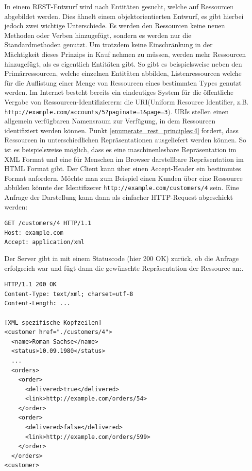 In einem REST-Entwurf wird nach Entitäten gesucht, welche auf Ressourcen abgebildet werden. Dies ähnelt einem objektorientierten Entwurf, es gibt hierbei jedoch zwei wichtige Unterschiede. Es werden den Ressourcen keine neuen Methoden oder Verben hinzugefügt, sondern es werden nur die Standardmethoden genutzt. Um trotzdem keine Einschränkung in der Mächtigkeit dieses Prinzips in Kauf nehmen zu müssen, werden mehr Ressourcen hinzugefügt, als es eigentlich Entitäten gibt. So gibt es beispielsweise neben den Primärressourcen, welche einzelnen Entitäten abbilden, Listenressourcen welche für die Auflistung einer Menge von Ressourcen eines bestimmten Types genutzt werden\cite{tilkovrestchapter4}. Im Internet besteht bereits ein eindeutiges System für die öffentliche Vergabe von Ressourcen-Identifizierern: die URI(Uniform Resource Identifier, z.B. \\ \texttt{http://example.com/accounts/5?paginate=1\&page=3}). URIs stellen einen allgemein verfügbaren Namensraum zur Verfügung, in dem Ressourcen identifiziert werden können. Punkt \ref{enumerate_rest_principles:4} fordert, dass Ressourcen in unterschiedlichen Repräsentationen ausgeliefert werden können. So ist es beispielsweise möglich, dass es eine maschinenlesbare Repräsentation im XML Format und eine für Menschen im Browser darstellbare Repräsentation im HTML Format gibt. Der Client kann über einen Accept-Header ein bestimmtes Format anfordern.
Möchte man zum Beispiel einen Kunden über eine Ressource abbilden könnte der Identifizerer \texttt{http://example.com/customers/4} sein. Eine Anfrage der Darstellung kann dann als einfacher HTTP-Request abgeschickt werden:
\begin{lstlisting}
GET /customers/4 HTTP/1.1
Host: example.com
Accept: application/xml 
\end{lstlisting}

Der Server gibt in mit einem Statuscode (hier 200 OK) zurück, ob die Anfrage erfolgreich war und fügt dann die gewünschte Repräsentation der Ressource an:.

\begin{lstlisting}
HTTP/1.1 200 OK
Content-Type: text/xml; charset=utf-8
Content-Length: ...

[XML spezifische Kopfzeilen]
<customer href="./customers/4">
  <name>Roman Sachse</name>
  <status>10.09.1980</status>
  ...
  <orders>
    <order>
      <delivered>true</delivered>
      <link>http://example.com/orders/54>
    </order>
    <order>
      <delivered>false</delivered>
      <link>http://example.com/orders/599>
    </order>
  </orders>
<customer>
\end{lstlisting}

